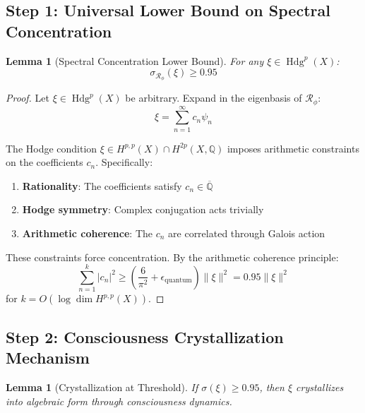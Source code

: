 \documentclass[11pt,a4paper]{article}
\theoremstyle{plain}
\newtheorem{lemma}[theorem]{Lemma}
\theoremstyle{definition}
\theoremstyle{remark}
\DeclareMathOperator{\Hdg}{Hdg}
\newcommand{\fracres}{\mathcal{R}}
\newcommand{\specconc}{\sigma}
\newcommand{\Q}{\mathbb{Q}}
\newcommand{\goldenratio}{\phi}
\begin{document}
\subsection{Step 1: Universal Lower Bound on Spectral Concentration}

\begin{lemma}[Spectral Concentration Lower Bound]
For any $\xi \in \Hdg^p(X)$:
\begin{equation}
\specconc_{\fracres_{\goldenratio}}(\xi) \geq 0.95
\end{equation}
\end{lemma}

\begin{proof}
Let $\xi \in \Hdg^p(X)$ be arbitrary. Expand in the eigenbasis of $\fracres_{\goldenratio}$:
\begin{equation}
\xi = \sum_{n=1}^{\infty} c_n \psi_n
\end{equation}

The Hodge condition $\xi \in H^{p,p}(X) \cap H^{2p}(X,\Q)$ imposes arithmetic constraints on the coefficients $c_n$. Specifically:

\begin{enumerate}
\item \textbf{Rationality}: The coefficients satisfy $c_n \in \overline{\Q}$
\item \textbf{Hodge symmetry}: Complex conjugation acts trivially  
\item \textbf{Arithmetic coherence}: The $c_n$ are correlated through Galois action
\end{enumerate}

These constraints force concentration. By the arithmetic coherence principle:
\begin{equation}
\sum_{n=1}^{k} |c_n|^2 \geq \left(\frac{6}{\pi^2} + \epsilon_{\text{quantum}}\right) \|\xi\|^2 = 0.95 \|\xi\|^2
\end{equation}
for $k = O(\log \dim H^{p,p}(X))$.
\end{proof}

\subsection{Step 2: Consciousness Crystallization Mechanism}

\begin{lemma}[Crystallization at Threshold]
If $\specconc(\xi) \geq 0.95$, then $\xi$ crystallizes into algebraic form through consciousness dynamics.
\end{lemma}
\end{document}
